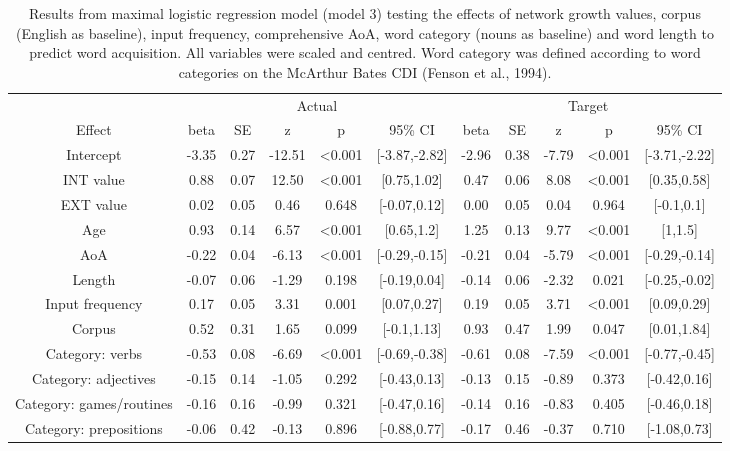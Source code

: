 \documentclass[
  man,floatsintext]{apa6}
\begin{document}
\begingroup\fontsize{7}{9}\selectfont

\begin{longtable}[t]{ccccccccccc}
\caption{\label{tab:full-data-summary}Results from maximal logistic regression model (model 3) testing the effects of network growth values, corpus (English as baseline), input frequency, comprehensive AoA, word category (nouns as baseline) and word length to predict word acquisition. All variables were scaled and centred. Word category was defined according to word categories on the McArthur Bates CDI (Fenson et al., 1994).}\\
\toprule
\multicolumn{1}{c}{ } & \multicolumn{5}{c}{Actual} & \multicolumn{5}{c}{Target} \\
\cmidrule(l{3pt}r{3pt}){2-6} \cmidrule(l{3pt}r{3pt}){7-11}
Effect & beta & SE & z & p & 95\% CI & beta & SE & z & p & 95\% CI\\
\midrule
Intercept & -3.35 & 0.27 & -12.51 & <0.001 & {}[-3.87,-2.82] & -2.96 & 0.38 & -7.79 & <0.001 & {}[-3.71,-2.22]\\
INT value & 0.88 & 0.07 & 12.50 & <0.001 & {}[0.75,1.02] & 0.47 & 0.06 & 8.08 & <0.001 & {}[0.35,0.58]\\
EXT value & 0.02 & 0.05 & 0.46 & 0.648 & {}[-0.07,0.12] & 0.00 & 0.05 & 0.04 & 0.964 & {}[-0.1,0.1]\\
Age & 0.93 & 0.14 & 6.57 & <0.001 & {}[0.65,1.2] & 1.25 & 0.13 & 9.77 & <0.001 & {}[1,1.5]\\
AoA & -0.22 & 0.04 & -6.13 & <0.001 & {}[-0.29,-0.15] & -0.21 & 0.04 & -5.79 & <0.001 & {}[-0.29,-0.14]\\
\addlinespace
Length & -0.07 & 0.06 & -1.29 & 0.198 & {}[-0.19,0.04] & -0.14 & 0.06 & -2.32 & 0.021 & {}[-0.25,-0.02]\\
Input frequency & 0.17 & 0.05 & 3.31 & 0.001 & {}[0.07,0.27] & 0.19 & 0.05 & 3.71 & <0.001 & {}[0.09,0.29]\\
Corpus & 0.52 & 0.31 & 1.65 & 0.099 & {}[-0.1,1.13] & 0.93 & 0.47 & 1.99 & 0.047 & {}[0.01,1.84]\\
Category: verbs & -0.53 & 0.08 & -6.69 & <0.001 & {}[-0.69,-0.38] & -0.61 & 0.08 & -7.59 & <0.001 & {}[-0.77,-0.45]\\
Category: adjectives & -0.15 & 0.14 & -1.05 & 0.292 & {}[-0.43,0.13] & -0.13 & 0.15 & -0.89 & 0.373 & {}[-0.42,0.16]\\
\addlinespace
Category: games/routines & -0.16 & 0.16 & -0.99 & 0.321 & {}[-0.47,0.16] & -0.14 & 0.16 & -0.83 & 0.405 & {}[-0.46,0.18]\\
Category: prepositions & -0.06 & 0.42 & -0.13 & 0.896 & {}[-0.88,0.77] & -0.17 & 0.46 & -0.37 & 0.710 & {}[-1.08,0.73]\\

\end{longtable}
\end{document}
